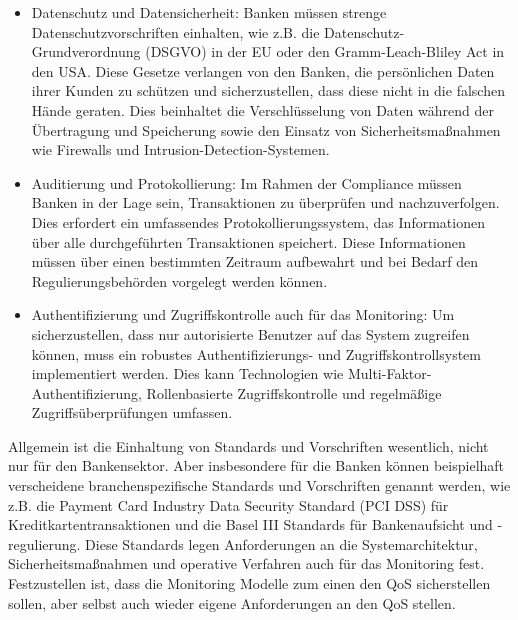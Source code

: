 \documentclass[../vs-script-first-v01.tex]{subfiles}
\begin{document}
\begin{itemize}
\item Datenschutz und Datensicherheit: Banken müssen strenge Datenschutzvorschriften einhalten, wie z.B. die Datenschutz-Grundverordnung (DSGVO) in der EU oder den Gramm-Leach-Bliley Act in den USA. Diese Gesetze verlangen von den Banken, die persönlichen Daten ihrer Kunden zu schützen und sicherzustellen, dass diese nicht in die falschen Hände geraten. Dies beinhaltet die Verschlüsselung von Daten während der Übertragung und Speicherung sowie den Einsatz von Sicherheitsmaßnahmen wie Firewalls und Intrusion-Detection-Systemen.
\item Auditierung und Protokollierung: Im Rahmen der Compliance müssen Banken in der Lage sein, Transaktionen zu überprüfen und nachzuverfolgen. Dies erfordert ein umfassendes Protokollierungssystem, das Informationen über alle durchgeführten Transaktionen speichert. Diese Informationen müssen über einen bestimmten Zeitraum aufbewahrt und bei Bedarf den Regulierungsbehörden vorgelegt werden können.
\item Authentifizierung und Zugriffskontrolle auch für das Monitoring: Um sicherzustellen, dass nur autorisierte Benutzer auf das System zugreifen können, muss ein robustes Authentifizierungs- und Zugriffskontrollsystem implementiert werden. Dies kann Technologien wie Multi-Faktor-Authentifizierung, Rollenbasierte Zugriffskontrolle und regelmäßige Zugriffsüberprüfungen umfassen.
\end{itemize}
Allgemein ist die Einhaltung von Standards und Vorschriften wesentlich, nicht nur für den Bankensektor. Aber insbesondere für die Banken können beispielhaft verscheidene branchenspezifische Standards und Vorschriften genannt werden, wie z.B. die Payment Card Industry Data Security Standard (PCI DSS) für Kreditkartentransaktionen und die Basel III Standards für Bankenaufsicht und -regulierung. Diese Standards legen Anforderungen an die Systemarchitektur, Sicherheitsmaßnahmen und operative Verfahren auch für das Monitoring fest. 
Festzustellen ist, dass die Monitoring Modelle zum einen den QoS sicherstellen sollen, aber selbst auch wieder eigene Anforderungen an den QoS stellen. 
\end{document}
